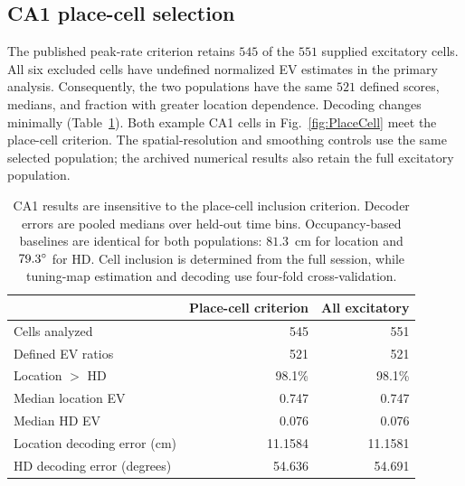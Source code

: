 \documentclass[11pt]{article}
\begin{document}
\subsection*{CA1 place-cell selection}
The published peak-rate criterion retains $545$ of the $551$ supplied excitatory cells. All six excluded cells have undefined normalized EV estimates in the primary analysis. Consequently, the two populations have the same $521$ defined scores, medians, and fraction with greater location dependence. Decoding changes minimally (Table~\ref{tab:ca1_selection}). Both example CA1 cells in Fig.~\ref{fig:PlaceCell} meet the place-cell criterion. The spatial-resolution and smoothing controls use the same selected population; the archived numerical results also retain the full excitatory population.
\begin{table}[htbp]\centering\small
\begin{tabular}{lrr}
 & Place-cell criterion & All excitatory \\\hline
Cells analyzed & 545 & 551 \\
Defined EV ratios & 521 & 521 \\
Location $>$ HD & 98.1\% & 98.1\% \\
Median location EV & 0.747 & 0.747 \\
Median HD EV & 0.076 & 0.076 \\
Location decoding error (cm) & 11.1584 & 11.1581 \\
HD decoding error (degrees) & 54.636 & 54.691 \\
\end{tabular}
\caption{CA1 results are insensitive to the place-cell inclusion criterion. Decoder errors are pooled medians over held-out time bins. Occupancy-based baselines are identical for both populations: $81.3$~cm for location and $79.3\degree$ for HD. Cell inclusion is determined from the full session, while tuning-map estimation and decoding use four-fold cross-validation.}
\label{tab:ca1_selection}
\end{table}
\end{document}
